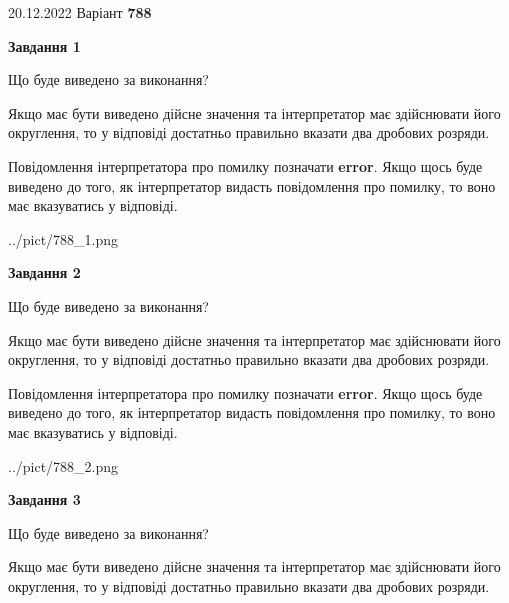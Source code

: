 \documentclass[12pt, ukrainian]{article}
\begin{document}
{20.12.2022 Варіант \No \textbf { 788 }\par}
{
\begin {Large}

{\begin {center}\textbf{Завдання 1}\end {center}}\par
Що буде виведено за виконання? \par

Якщо має бути виведено дійсне значення та інтерпретатор має здійснювати його округлення, 
то у відповіді достатньо правильно вказати два дробових розряди.

Повідомлення інтерпретатора про помилку позначати \textbf{error}.
Якщо щось буде виведено до того, як інтерпретатор видасть повідомлення про помилку, 
то воно має вказуватись у відповіді. \par

\begin{center}
	{../pict/788_1.png}
\end{center}
\newpage

{\begin {center}\textbf{Завдання 2}\end {center}}\par
Що буде виведено за виконання? \par

Якщо має бути виведено дійсне значення та інтерпретатор має здійснювати його округлення, 
то у відповіді достатньо правильно вказати два дробових розряди.

Повідомлення інтерпретатора про помилку позначати \textbf{error}.
Якщо щось буде виведено до того, як інтерпретатор видасть повідомлення про помилку, 
то воно має вказуватись у відповіді. \par

\begin{center}
	{../pict/788_2.png}
\end{center}
\newpage

{\begin {center}\textbf{Завдання 3}\end {center}}\par
Що буде виведено за виконання? \par

Якщо має бути виведено дійсне значення та інтерпретатор має здійснювати його округлення, 
то у відповіді достатньо правильно вказати два дробових розряди.


\end{Large}}
\end{document}
